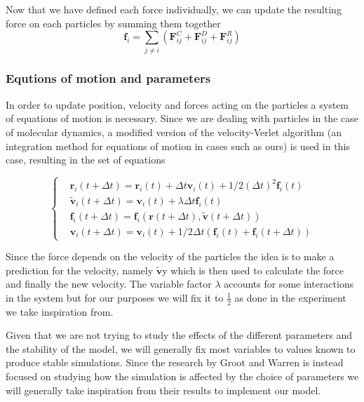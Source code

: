 \documentclass[]{usiinfbachelorproject}
\begin{document}
Now that we have defined each force individually, we can update the resulting force on each particles by summing them together 
\begin{equation}
  \label{eq:forces}
  \textbf{f}_i = \sum_{j \neq i} (\textbf{F}^C_{ij} + \textbf{F}^D_{ij} + \textbf{F}^R_{ij})
\end{equation}

\subsubsection{Equtions of motion and parameters}\label{sub:EqMotion}
In order to update position, velocity and forces acting on the particles a system of equations of motion is 
necessary. Since we are dealing with particles in the case of molecular dynamics, a modified version of the 
velocity-Verlet algorithm (an integration method for equations of motion in cases such as ours) is used in this case, 
resulting in the set of equations 

\begin{equation*}
    \left\{
        \begin{aligned}
          & \textbf{r}_i (t + \Delta t) = \textbf{r}_i (t) + \Delta t \textbf{v}_i (t) + 1/2(\Delta t)^2 \textbf{f}_i(t)\\
          & \tilde{\textbf{v}}_i (t + \Delta t) = \textbf{v}_i (t) + \lambda  \Delta t \textbf{f}_i(t)\\
          & \textbf{f}_i(t + \Delta t) = \textbf{f}_i(\textbf{r} (t + \Delta t), \tilde{\textbf{v}} (t + \Delta t))\\
          & \textbf{v}_i (t + \Delta t) = \textbf{v}_i (t) + 1/2 \Delta t (\textbf{f}_i(t) + \textbf{f}_i(t + \Delta t))
        \end{aligned}
      \right.
\end{equation*}
\vspace{2em}

Since the force depends on the velocity of the particles the idea is to make a prediction for the velocity, namely 
$\tilde{\textbf{v}}$y which is then used to calculate the force and finally the new velocity. The variable factor 
$\lambda$ accounts for some interactions in the system but for our purposes we will fix it to $\frac{1}{2}$ as 
done in the experiment we take inspiration from. 

Given that we are not trying to study the effects of the different parameters and the stability of the model, we 
will generally fix most variables to values known to produce stable simulations. Since the research by Groot and Warren is 
instead focused on studying how the simulation is affected by the choice of parameters we will generally take inspiration 
from their results to implement our model.
\end{document}
